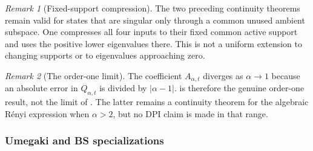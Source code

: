 \documentclass[11pt]{article}
\theoremstyle{remark}
\newtheorem{remark}[remark]{Remark}
\newcommand{\1}{\mathbbm{1}}
\begin{document}
\begin{remark}[Fixed-support compression]
The two preceding continuity theorems remain valid for states that
are singular only through a common unused ambient subspace.  One
compresses all four inputs to their fixed common active support and
uses the positive lower eigenvalues there.  This is not a uniform
extension to changing supports or to eigenvalues approaching zero.
\end{remark}

\begin{remark}[The order-one limit]
The coefficient $A_{\alpha,t}$ diverges as $\alpha\to1$ because an
absolute error in $Q_{\alpha,t}$ is divided by $|\alpha-1|$.
 is therefore the genuine
order-one result, not the limit of
.  The latter remains a
continuity theorem for the algebraic R\'enyi expression when
$\alpha>2$, but no DPI claim is made in that range.
\end{remark}

\subsubsection{Umegaki and BS specializations}
\label{subsec:joint-continuity-endpoints}
\end{document}
